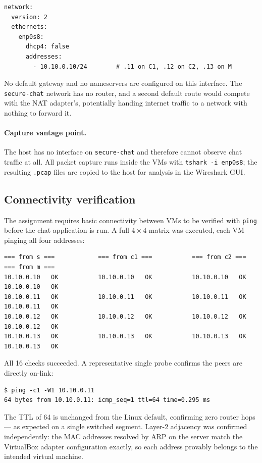 \documentclass[11pt,a4paper]{article}
\begin{document}
\begin{lstlisting}
network:
  version: 2
  ethernets:
    enp0s8:
      dhcp4: false
      addresses:
        - 10.10.0.10/24        # .11 on C1, .12 on C2, .13 on M
\end{lstlisting}

No default gateway and no nameservers are configured on this interface. The \texttt{secure-chat}
network has no router, and a second default route would compete with the NAT adapter's, potentially
handing internet traffic to a network with nothing to forward it.

\paragraph{Capture vantage point.} The host has no interface on \texttt{secure-chat} and therefore
cannot observe chat traffic at all. All packet capture runs inside the VMs with
\texttt{tshark -i enp0s8}; the resulting \texttt{.pcap} files are copied to the host for analysis in
the Wireshark GUI.

\subsection{Connectivity verification}

The assignment requires basic connectivity between VMs to be verified with \texttt{ping} before the
chat application is run. A full $4\times4$ matrix was executed, each VM pinging all four addresses:

\begin{lstlisting}
=== from s ===            === from c1 ===           === from c2 ===           === from m ===
10.10.0.10   OK           10.10.0.10   OK           10.10.0.10   OK           10.10.0.10   OK
10.10.0.11   OK           10.10.0.11   OK           10.10.0.11   OK           10.10.0.11   OK
10.10.0.12   OK           10.10.0.12   OK           10.10.0.12   OK           10.10.0.12   OK
10.10.0.13   OK           10.10.0.13   OK           10.10.0.13   OK           10.10.0.13   OK
\end{lstlisting}

All 16 checks succeeded. A representative single probe confirms the peers are directly on-link:

\begin{lstlisting}
$ ping -c1 -W1 10.10.0.11
64 bytes from 10.10.0.11: icmp_seq=1 ttl=64 time=0.295 ms
\end{lstlisting}

The TTL of 64 is unchanged from the Linux default, confirming zero router hops --- as expected on a
single switched segment. Layer-2 adjacency was confirmed independently: the MAC addresses resolved
by ARP on the server match the VirtualBox adapter configuration exactly, so each address provably
belongs to the intended virtual machine.
\end{document}
